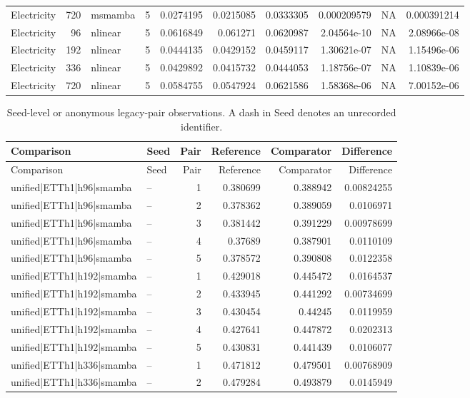 \begin{longtable}{lrllrrrrrr}
Electricity & 720 & msmamba & 5 & 0.0274195 & 0.0215085 & 0.0333305 & 0.000209579 & NA & 0.000391214 \\
Electricity & 96 & nlinear & 5 & 0.0616849 & 0.061271 & 0.0620987 & 2.04564e-10 & NA & 2.08966e-08 \\
Electricity & 192 & nlinear & 5 & 0.0444135 & 0.0429152 & 0.0459117 & 1.30621e-07 & NA & 1.15496e-06 \\
Electricity & 336 & nlinear & 5 & 0.0429892 & 0.0415732 & 0.0444053 & 1.18756e-07 & NA & 1.10839e-06 \\
Electricity & 720 & nlinear & 5 & 0.0584755 & 0.0547924 & 0.0621586 & 1.58368e-06 & NA & 7.00152e-06 \\
\bottomrule
\end{longtable}

\begin{longtable}{llrrrr}
\caption{Seed-level or anonymous legacy-pair observations. A dash in Seed denotes an unrecorded identifier.}\\
\toprule
Comparison & Seed & Pair & Reference & Comparator & Difference \\
\midrule
\endfirsthead
\toprule
Comparison & Seed & Pair & Reference & Comparator & Difference \\
\midrule
\endhead
unified|ETTh1|h96|smamba & -- & 1 & 0.380699 & 0.388942 & 0.00824255 \\
unified|ETTh1|h96|smamba & -- & 2 & 0.378362 & 0.389059 & 0.0106971 \\
unified|ETTh1|h96|smamba & -- & 3 & 0.381442 & 0.391229 & 0.00978699 \\
unified|ETTh1|h96|smamba & -- & 4 & 0.37689 & 0.387901 & 0.0110109 \\
unified|ETTh1|h96|smamba & -- & 5 & 0.378572 & 0.390808 & 0.0122358 \\
unified|ETTh1|h192|smamba & -- & 1 & 0.429018 & 0.445472 & 0.0164537 \\
unified|ETTh1|h192|smamba & -- & 2 & 0.433945 & 0.441292 & 0.00734699 \\
unified|ETTh1|h192|smamba & -- & 3 & 0.430454 & 0.44245 & 0.0119959 \\
unified|ETTh1|h192|smamba & -- & 4 & 0.427641 & 0.447872 & 0.0202313 \\
unified|ETTh1|h192|smamba & -- & 5 & 0.430831 & 0.441439 & 0.0106077 \\
unified|ETTh1|h336|smamba & -- & 1 & 0.471812 & 0.479501 & 0.00768909 \\
unified|ETTh1|h336|smamba & -- & 2 & 0.479284 & 0.493879 & 0.0145949 \\

\end{longtable}

